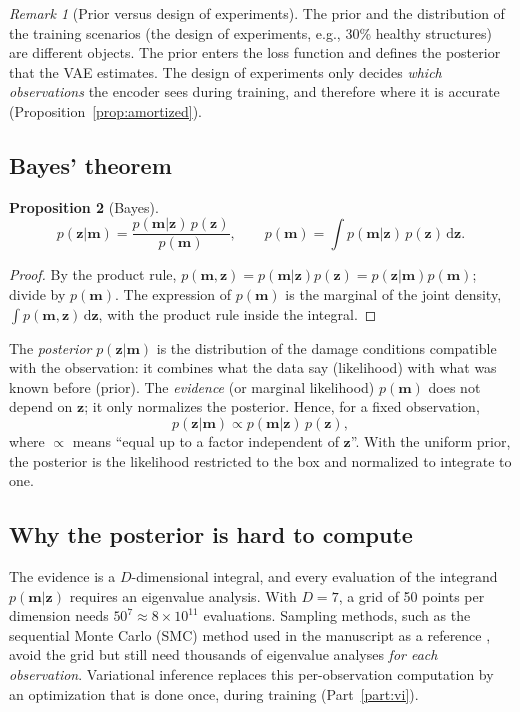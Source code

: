 \documentclass[11pt,a4paper]{article}
\numberwithin{equation}{section}
\theoremstyle{plain}
\newtheorem{proposition}{Proposition}[section]
\theoremstyle{definition}
\theoremstyle{remark}
\newtheorem{remark}[proposition]{Remark}
\newcommand{\m}{\mathbf{m}}
\newcommand{\z}{\mathbf{z}}
\newcommand{\dd}{\,\mathrm{d}}
\begin{document}
\begin{remark}[Prior versus design of experiments]
\label{rem:doe}
The prior and the distribution of the training scenarios (the design of experiments, e.g., 30\% healthy structures) are different objects. The prior enters the loss function and defines the posterior that the VAE estimates. The design of experiments only decides \emph{which observations} the encoder sees during training, and therefore where it is accurate (Proposition~\ref{prop:amortized}).
\end{remark}

\subsection{Bayes' theorem}
\begin{proposition}[Bayes]
\begin{equation}
p(\z|\m)=\frac{p(\m|\z)\,p(\z)}{p(\m)},\qquad p(\m)=\int p(\m|\z)\,p(\z)\dd\z.
\label{eq:bayes}
\end{equation}
\end{proposition}
\begin{proof}
By the product rule, $p(\m,\z)=p(\m|\z)p(\z)=p(\z|\m)p(\m)$; divide by $p(\m)$. The expression of $p(\m)$ is the marginal of the joint density, $\int p(\m,\z)\dd\z$, with the product rule inside the integral.
\end{proof}
The \emph{posterior} $p(\z|\m)$ is the distribution of the damage conditions compatible with the observation: it combines what the data say (likelihood) with what was known before (prior). The \emph{evidence} (or marginal likelihood) $p(\m)$ does not depend on $\z$; it only normalizes the posterior. Hence, for a fixed observation,
\begin{equation}
p(\z|\m)\propto p(\m|\z)\,p(\z),
\end{equation}
where $\propto$ means ``equal up to a factor independent of $\z$''. With the uniform prior, the posterior is the likelihood restricted to the box and normalized to integrate to one.

\subsection{Why the posterior is hard to compute}
The evidence is a $D$-dimensional integral, and every evaluation of the integrand $p(\m|\z)$ requires an eigenvalue analysis. With $D=7$, a grid of 50 points per dimension needs $50^7\approx8\times10^{11}$ evaluations. Sampling methods, such as the sequential Monte Carlo (SMC) method used in the manuscript as a reference \cite{delmoral2006smc}, avoid the grid but still need thousands of eigenvalue analyses \emph{for each observation}. Variational inference replaces this per-observation computation by an optimization that is done once, during training (Part~\ref{part:vi}).
\end{document}
